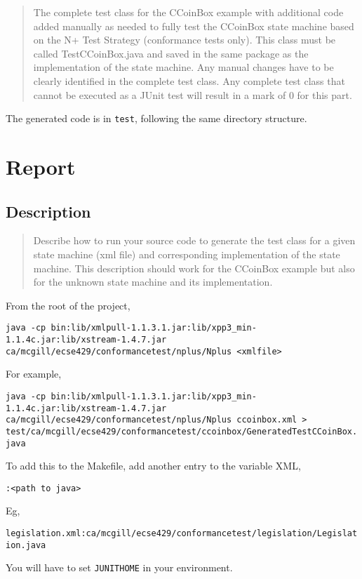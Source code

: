 \documentclass[ieee]{submit}
\begin{document}
\begin{quote}
The complete test class for the CCoinBox example with additional code added manually as
needed to fully test the CCoinBox state machine based on the N+ Test Strategy (conformance tests only). This class must be called TestCCoinBox.java and saved in the same package as the implementation of the state machine. Any manual changes have to be clearly identified in the
complete test class. Any complete test class that cannot be executed as a JUnit test will result in a mark of 0 for this part.
\end{quote}

The generated code is in {\tt test}, following the same directory structure.

\section{Report}

\subsection{Description}

\begin{quote}
Describe how to run your source code to generate the test class for a given state machine (xml file) and corresponding implementation of the state machine. This description should work for the CCoinBox example but also for the unknown state machine and its implementation.
\end{quote}

From the root of the project,

{\tt java -cp bin:lib/xmlpull-1.1.3.1.jar:lib/xpp3\_min-1.1.4c.jar:lib/xstream-1.4.7.jar ca/mcgill/ecse429/conformancetest/nplus/Nplus <xmlfile>}

For example,

{\tt java -cp bin:lib/xmlpull-1.1.3.1.jar:lib/xpp3\_min-1.1.4c.jar:lib/xstream-1.4.7.jar ca/mcgill/ecse429/conformancetest/nplus/Nplus ccoinbox.xml > test/ca/mcgill/ecse429/conformancetest/ccoinbox/GeneratedTestCCoinBox.java}

To add this to the Makefile, add another entry to the variable XML,

{\tt <xml file>:<path to java>}

Eg,

{\tt legislation.xml:ca/mcgill/ecse429/conformancetest/legislation/Legislation.java}

You will have to set {\tt JUNITHOME} in your environment.
\end{document}
